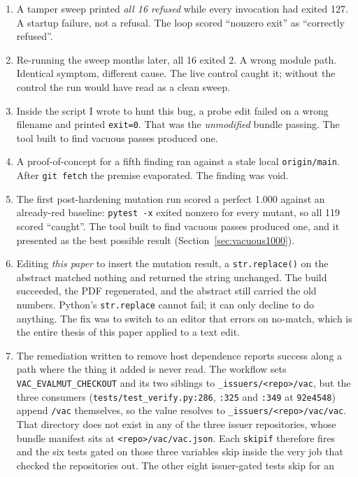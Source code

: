 \documentclass[11pt]{article}
\begin{document}
\begin{enumerate}
\item A tamper sweep printed \emph{all 16 refused} while every invocation had exited 127. A
startup failure, not a refusal. The loop scored ``nonzero exit'' as ``correctly refused''.
\item Re-running the sweep months later, all 16 exited 2. A wrong module path. Identical
symptom, different cause. The live control caught it; without the control the run would have
read as a clean sweep.
\item Inside the script I wrote to hunt this bug, a probe edit failed on a wrong filename and
printed \texttt{exit=0}. That was the \emph{unmodified} bundle passing. The tool built to find
vacuous passes produced one.
\item A proof-of-concept for a fifth finding ran against a stale local \texttt{origin/main}.
After \texttt{git fetch} the premise evaporated. The finding was void.
\item The first post-hardening mutation run scored a perfect 1.000 against an already-red
baseline: \texttt{pytest -x} exited nonzero for every mutant, so all 119 scored ``caught''.
The tool built to find vacuous passes produced one, and it presented as the best possible
result (Section~\ref{sec:vacuous1000}).
\item Editing \emph{this paper} to insert the mutation result, a \texttt{str.replace()} on the
abstract matched nothing and returned the string unchanged. The build succeeded, the PDF
regenerated, and the abstract still carried the old numbers. Python's \texttt{str.replace}
cannot fail; it can only decline to do anything. The fix was to switch to an editor that
errors on no-match, which is the entire thesis of this paper applied to a text edit.
\item The remediation written to remove host dependence reports success along a path where the
thing it added is never read. The workflow sets \texttt{VAC\_EVALMUT\_CHECKOUT} and its two
siblings to \texttt{\_issuers/<repo>/vac}, but the three consumers
(\texttt{tests/test\_verify.py:286}, \texttt{:325} and \texttt{:349} at \texttt{92e4548})
append \texttt{/vac} themselves, so the value resolves to
\texttt{\_issuers/<repo>/vac/vac}. That directory does not exist in any of the three issuer
repositories, whose bundle manifest sits at \texttt{<repo>/vac/vac.json}. Each
\texttt{skipif} therefore fires and the six tests gated on those three variables skip inside
the very job that checked the repositories out. The other eight issuer-gated tests skip for an

\end{enumerate}
\end{document}
